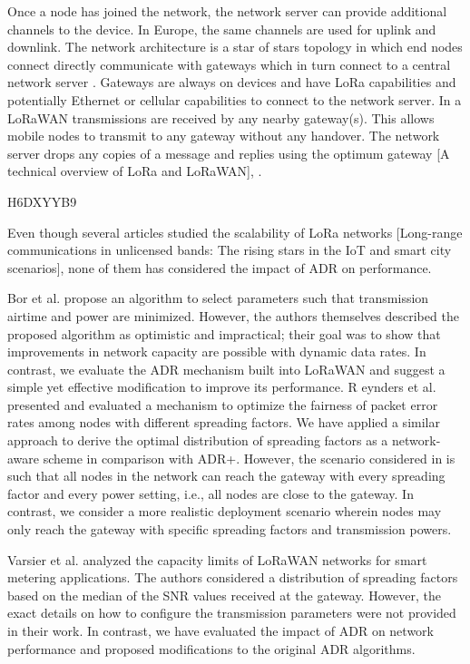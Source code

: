Once a node has joined the network,
	the network server can provide additional channels to the device.
In Europe,
	the same channels are used for uplink and downlink.
The network architecture is a star of stars topology in which end nodes connect directly communicate with gateways which in turn connect to a central network server \cite{bankov_limits_2016}.
Gateways are always on devices and have LoRa capabilities and potentially Ethernet or cellular capabilities to connect to the network server.
In a LoRaWAN transmissions are received by any nearby gateway(s).
This allows mobile nodes to transmit to any gateway without any handover.
The network server drops any copies of a message and replies using the optimum gateway [A technical overview of LoRa and LoRaWAN],
	\cite{wixted_evaluation_2016}.

\cite{slabicki_adaptive_2018} H6DXYYB9

Even though several articles studied the scalability of LoRa networks [Long-range communications in unlicensed bands:
	The rising stars in the IoT and smart city scenarios]\cite{petajajarvi_coverage_2015}\cite{augustin_study_2016},
	none of them has considered the impact of ADR on performance.

Bor et al.
\cite{bor_lora_2016} propose an algorithm to select parameters such that transmission airtime and power are minimized.
However,
	the authors themselves described the proposed algorithm as optimistic and impractical;
	their goal was to show that improvements in network capacity are possible with dynamic data rates.
In contrast,
	we evaluate the ADR mechanism built into LoRaWAN and suggest a simple yet effective modification to improve its performance.
R
eynders et al.
\cite{reynders_power_2017} presented and evaluated a mechanism to optimize the fairness of packet error rates among nodes with different spreading factors.
We have applied a similar approach to derive the optimal distribution of spreading factors as a network-aware scheme in comparison with ADR+.
However,
	the scenario considered in \cite{reynders_power_2017} is such that all nodes in the network can reach the gateway with every spreading factor and every power setting,
	i.e.,
	all nodes are close to the gateway.
In contrast,
	we consider a more realistic deployment scenario wherein nodes may only reach the gateway with specific spreading factors and transmission powers.

Varsier et al.
\cite{varsier_capacity_2017} analyzed the capacity limits of LoRaWAN networks for smart metering applications.
The authors considered a distribution of spreading factors based on the median of the SNR values received at the gateway.
However,
	the exact details on how to configure the transmission parameters were not provided in their work.
In contrast,
	we have evaluated the impact of ADR on network performance and proposed modifications to the original ADR algorithms.

